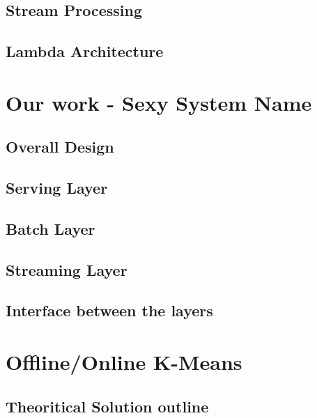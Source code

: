 \documentclass{lmproj}
\begin{document}
\section{Stream Processing}
\label{relatedwork}

\section{Lambda Architecture}
\label{relatedwork}


\chapter{Our work - Sexy System Name}
\label{systemdescr}

\section{Overall Design}
\label{systemdescr}


\section{Serving Layer}
\label{systemdescr}

\section{Batch Layer}
\label{systemdescr}

\section{Streaming Layer}
\label{systemdescr}

\section{Interface between the layers}
\label{systemdescr}




\chapter{Offline/Online K-Means}
\label{kmeans}

\section{Theoritical Solution outline}
\label{kmeans}
\end{document}
